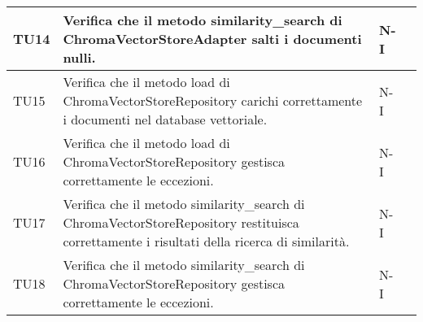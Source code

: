 \begin{table}[h!]
\begin{tabularx}{\textwidth}{|p{}|X|p{}|p{}|}
    TU14 & Verifica che il metodo similarity\_search di ChromaVectorStoreAdapter salti i documenti nulli. &  N-I \\ \hline
    TU15 & Verifica che il metodo load di ChromaVectorStoreRepository carichi correttamente i documenti nel database vettoriale. &  N-I \\ \hline
    TU16 & Verifica che il metodo load di ChromaVectorStoreRepository gestisca correttamente le eccezioni. &  N-I \\ \hline
    TU17 & Verifica che il metodo similarity\_search di ChromaVectorStoreRepository restituisca correttamente i risultati della ricerca di similarità. &  N-I \\ \hline
    TU18 & Verifica che il metodo similarity\_search di ChromaVectorStoreRepository gestisca correttamente le eccezioni. &  N-I \\ \hline
    \end{tabularx}
\end{table}

\newpage

